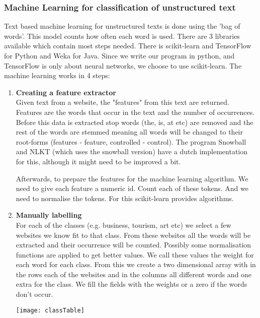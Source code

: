 \subsubsection{Machine Learning for classification of unstructured text}
Text based machine learning for unstructured texts is done using the 'bag of words'. This model counts how often each word is used. There are 3 libraries available which contain most steps needed. There is scikit-learn \cite{scikit-learn} and TensorFlow \cite{tensorFlow} for Python and Weka \cite{weka} for Java. Since we write our program in python, and TensorFlow is only about neural networks, we choose to use scikit-learn.
The machine learning works in 4 steps:
\begin{enumerate}
    \item \textbf{Creating a feature extractor} \\
    Given text from a website, the "features" from this text are returned. Features are the words that occur in the text and the number of occurrences. Before this data is extracted stop words (the, is, at etc) are removed and the rest of the words are stemmed meaning all words will be changed to their root-forms (features - feature, controlled - control). The program Snowball \cite{snowball_dutch} and NLKT \cite{nlkt_stemming} (which uses the snowball version) have a dutch implementation for this, although it might need to be improved a bit.
    
    Afterwards, to prepare the features for the machine learning algorithm. We need to give each feature a numeric id. Count each of these tokens. And we need to normalise the tokens. For this scikit-learn provides algorithms.
    \item \textbf{Manually labelling} \\
    For each of the classes (e.g. business, tourism, art etc) we select a few websites we know fit to that class. From these websites all the words will be extracted and their occurrence will be counted. Possibly some normalisation functions are applied to get better values. We call these values the weight for each word for each class. From this we create a two dimensional array with in the rows each of the websites and in the columns all different words and one extra for the class. We fill the fields with the weights or a zero if the words don't occur.
    
    \texttt{[image: classTable]}
    

\end{enumerate}
